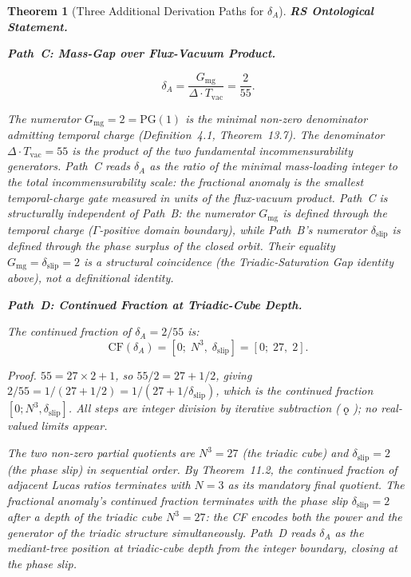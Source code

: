 \documentclass[11pt, letterpaper]{article}
\newcommand{\koppa}{\mathbin{\text{\rm\k{o}}}}
\newcommand{\Tcharge}{\Gamma}
\theoremstyle{definition}
\theoremstyle{plain}
\newtheorem{theorem}{Theorem}[section]
\begin{document}
\begin{theorem}[Three Additional Derivation Paths for $\delta_A$]

\textbf{RS Ontological Statement.}

\noindent\textbf{Path~C: Mass-Gap over Flux-Vacuum Product.}

\begin{equation}
    \delta_A = \frac{G_\mathrm{mg}}{\Delta \cdot T_\mathrm{vac}} = \frac{2}{55}.
    \label{eq:pathC}
\end{equation}

The numerator $G_\mathrm{mg} = 2 = \mathrm{PG}(1)$ is the minimal non-zero denominator
admitting temporal charge (Definition~4.1, Theorem~13.7). The denominator
$\Delta \cdot T_\mathrm{vac} = 55$ is the product of the two fundamental
incommensurability generators. Path~C reads $\delta_A$ as the ratio of the
minimal mass-loading integer to the total incommensurability scale: the fractional
anomaly is the smallest temporal-charge gate measured in units of the flux-vacuum
product. Path~C is structurally independent of Path~B: the numerator $G_\mathrm{mg}$
is defined through the temporal charge ($\Tcharge$-positive domain boundary), while Path~B's
numerator $\delta_\mathrm{slip}$ is defined through the phase surplus of the closed
orbit. Their equality $G_\mathrm{mg} = \delta_\mathrm{slip} = 2$ is a structural
coincidence (the Triadic-Saturation Gap identity above), not a definitional identity.

\medskip
\noindent\textbf{Path~D: Continued Fraction at Triadic-Cube Depth.}

The continued fraction of $\delta_A = 2/55$ is:
\begin{equation}
    \mathrm{CF}(\delta_A) = \left[0;\; N^3,\; \delta_\mathrm{slip}\right]
                          = \left[0;\; 27,\; 2\right].
    \label{eq:pathD}
\end{equation}

\textit{Proof.} $55 = 27 \times 2 + 1$, so $55/2 = 27 + 1/2$, giving $2/55 =
1/(27 + 1/2) = 1/(27 + 1/\delta_\mathrm{slip})$, which is the continued fraction
$[0; N^3, \delta_\mathrm{slip}]$. All steps are integer division by iterative
subtraction ($\;\koppa\;$); no real-valued limits appear.

The two non-zero partial quotients are $N^3 = 27$ (the triadic cube) and
$\delta_\mathrm{slip} = 2$ (the phase slip) in sequential order. By Theorem~11.2,
the continued fraction of adjacent Lucas ratios terminates with $N = 3$ as its
mandatory final quotient. The fractional anomaly's continued fraction terminates with
the \emph{phase slip} $\delta_\mathrm{slip} = 2$ after a depth of \emph{the triadic
cube} $N^3 = 27$: the CF encodes both the power and the generator of the triadic
structure simultaneously. Path~D reads $\delta_A$ as the mediant-tree position at
triadic-cube depth from the integer boundary, closing at the phase slip.


\end{theorem}
\end{document}
